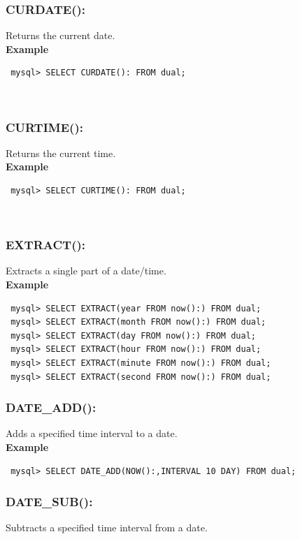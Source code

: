 \documentclass[11pt,a4paper]{article}
\begin{document}
\subsubsection*{CURDATE():} Returns the current date.\\

\textbf{Example}
\begin{verbatim} mysql> SELECT CURDATE(): FROM dual; \end{verbatim}\\

\subsubsection*{CURTIME():} Returns the current time.\\

\textbf{Example}
\begin{verbatim} mysql> SELECT CURTIME(): FROM dual; \end{verbatim}\\

\subsubsection*{EXTRACT():} Extracts a single part of a date/time.\\

\textbf{Example}
\begin{verbatim}
 mysql> SELECT EXTRACT(year FROM now():) FROM dual; 
 mysql> SELECT EXTRACT(month FROM now():) FROM dual; 
 mysql> SELECT EXTRACT(day FROM now():) FROM dual; 
 mysql> SELECT EXTRACT(hour FROM now():) FROM dual;
 mysql> SELECT EXTRACT(minute FROM now():) FROM dual; 
 mysql> SELECT EXTRACT(second FROM now():) FROM dual; \end{verbatim}

\subsubsection*{DATE\_ADD():}  Adds a specified time interval to a date.\\

\textbf{Example}
\begin{verbatim} mysql> SELECT DATE_ADD(NOW():,INTERVAL 10 DAY) FROM dual; \end{verbatim}

\subsubsection*{DATE\_SUB():} Subtracts a specified time interval from a date.\\
\end{document}
